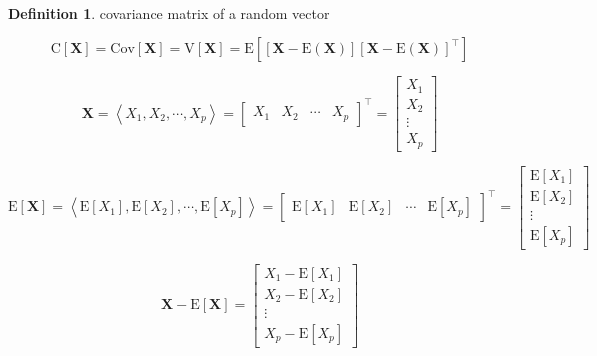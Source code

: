 \documentclass[
]{book}
\theoremstyle{definition}
\newtheorem{definition}{Definition}[chapter]
\theoremstyle{definition}
\theoremstyle{definition}
\theoremstyle{definition}
\theoremstyle{remark}
\begin{document}
\begin{definition}
\protect\hypertarget{def:unnamed-chunk-2}{}\label{def:unnamed-chunk-2}covariance matrix of a random vector\textsuperscript{}
\end{definition}

\[ 
  \mathrm{C}\left[\boldsymbol{X}\right]=\mathrm{Cov}\left[\boldsymbol{X}\right]=\mathrm{V}\left[\boldsymbol{X}\right]=\mathrm{E}\left[\left[\boldsymbol{X}-\mathrm{E}\left(\boldsymbol{X}\right)\right]\left[\boldsymbol{X}-\mathrm{E}\left(\boldsymbol{X}\right)\right]^{\intercal}\right]
\]

\[
\boldsymbol{X}=\left\langle X_{1},X_{2},\cdots,X_{p}\right\rangle =\begin{bmatrix}X_{1} & X_{2} & \cdots & X_{p}\end{bmatrix}^{\intercal}=\begin{bmatrix}X_{1}\\
X_{2}\\
\vdots\\
X_{p}
\end{bmatrix}
\]

\[
\mathrm{E}\left[\boldsymbol{X}\right]=\left\langle \mathrm{E}\left[X_{1}\right],\mathrm{E}\left[X_{2}\right],\cdots,\mathrm{E}\left[X_{p}\right]\right\rangle =\begin{bmatrix}\mathrm{E}\left[X_{1}\right] & \mathrm{E}\left[X_{2}\right] & \cdots & \mathrm{E}\left[X_{p}\right]\end{bmatrix}^{\intercal}=\begin{bmatrix}\mathrm{E}\left[X_{1}\right]\\
\mathrm{E}\left[X_{2}\right]\\
\vdots\\
\mathrm{E}\left[X_{p}\right]
\end{bmatrix}
\]

\[
\boldsymbol{X}-\mathrm{E}\left[\boldsymbol{X}\right]=\begin{bmatrix}X_{1}-\mathrm{E}\left[X_{1}\right]\\
X_{2}-\mathrm{E}\left[X_{2}\right]\\
\vdots\\
X_{p}-\mathrm{E}\left[X_{p}\right]
\end{bmatrix}
\]
\end{document}
